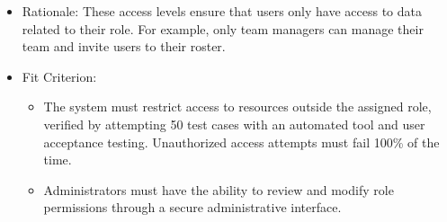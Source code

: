 \documentclass{article}
\begin{document}
\begin{enumerate}
\begin{itemize}
            \item Rationale: These access levels ensure that users only have access to data related to their role. For example, only team managers can manage their team and invite users to their roster.
            \item Fit Criterion:
            \begin{itemize}
                \item The system must restrict access to resources outside the assigned role, verified by attempting 50 test cases with an automated tool and user acceptance testing. Unauthorized access attempts must fail 100\% of the time.
                \item Administrators must have the ability to review and modify role permissions through a secure administrative interface.
            \end{itemize}    
        \end{itemize}
\end{enumerate}
\end{document}

